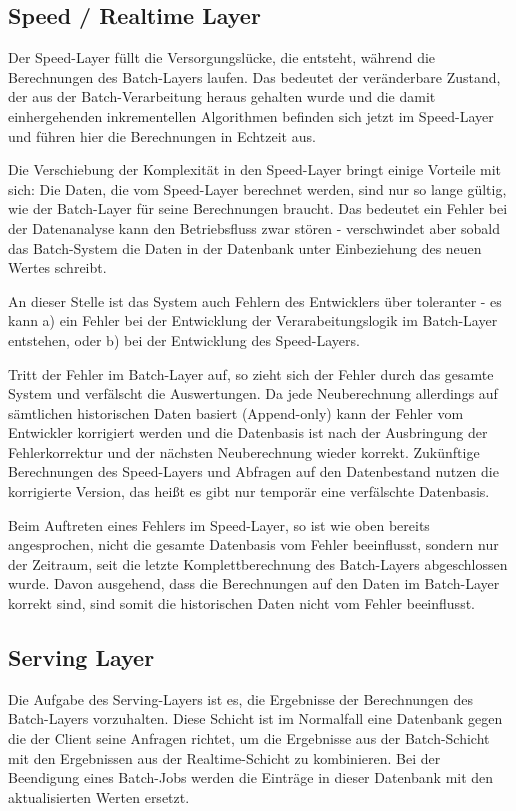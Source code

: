 \documentclass[a4paper,11pt]{scrartcl}
\begin{document}
  \subsection{Speed / Realtime Layer}
  Der Speed-Layer füllt die Versorgungslücke, die entsteht, während die
  Berechnungen des Batch-Layers laufen. Das bedeutet der veränderbare Zustand,
  der aus der Batch-Verarbeitung heraus gehalten wurde und die damit
  einhergehenden inkrementellen Algorithmen befinden sich jetzt im Speed-Layer
  und führen hier die Berechnungen in Echtzeit aus.

  Die Verschiebung der Komplexität in den Speed-Layer bringt einige Vorteile mit
  sich: Die Daten, die vom Speed-Layer berechnet werden, sind nur so lange
  gültig, wie der Batch-Layer für seine Berechnungen braucht. Das bedeutet ein
  Fehler bei der Datenanalyse kann den Betriebsfluss zwar stören - verschwindet
  aber sobald das Batch-System die Daten in der Datenbank unter Einbeziehung des
  neuen Wertes schreibt.

  An dieser Stelle ist das System auch Fehlern des Entwicklers über toleranter -
  es kann a) ein Fehler bei der Entwicklung der Verarabeitungslogik im
  Batch-Layer entstehen, oder b) bei der Entwicklung des Speed-Layers.

  Tritt der Fehler im Batch-Layer auf, so zieht sich der Fehler durch das
  gesamte System und verfälscht die Auswertungen. Da jede Neuberechnung
  allerdings auf sämtlichen historischen Daten basiert (Append-only) kann der
  Fehler vom Entwickler korrigiert werden und die Datenbasis ist nach der
  Ausbringung der Fehlerkorrektur und der nächsten Neuberechnung wieder
  korrekt. Zukünftige Berechnungen des Speed-Layers und Abfragen auf den
  Datenbestand nutzen die korrigierte Version, das heißt es gibt nur temporär
  eine verfälschte Datenbasis.

  Beim Auftreten eines Fehlers im Speed-Layer, so ist wie oben bereits
  angesprochen, nicht die gesamte Datenbasis vom Fehler beeinflusst, sondern nur
  der Zeitraum, seit die letzte Komplettberechnung des Batch-Layers abgeschlossen
  wurde. Davon ausgehend, dass die Berechnungen auf den Daten im Batch-Layer
  korrekt sind, sind somit die historischen Daten nicht vom Fehler beeinflusst.

  \subsection{Serving Layer}

  Die Aufgabe des Serving-Layers ist es, die Ergebnisse der Berechnungen des
  Batch-Layers vorzuhalten. Diese Schicht ist im Normalfall eine Datenbank
  gegen die der Client seine Anfragen richtet, um die Ergebnisse aus der
  Batch-Schicht mit den Ergebnissen aus der Realtime-Schicht zu kombinieren.
  Bei der Beendigung eines Batch-Jobs werden die Einträge in dieser Datenbank
  mit den aktualisierten Werten ersetzt.
\end{document}
